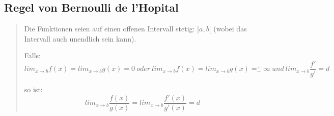 \subsection*{Regel von Bernoulli de l'Hopital}
\begin{quote}
Die Funktionen seien auf einen offenen Intervall stetig: $]a,b[$
(wobei das Intervall auch unendlich sein kann).

Falls:
\[
lim_{x\rightarrow b}f(x)=lim_{x\rightarrow b}g(x)=0\: oder\: lim_{x\rightarrow b}f(x)=lim_{x\rightarrow b}g(x)=_{-}^{+}\infty\: und\: lim_{x\rightarrow b}\frac{f'}{g'}=d
\]


so ist: 
\[
lim_{x\rightarrow b}\frac{f(x)}{g(x)}=lim_{x\rightarrow b}\frac{f'(x)}{g'(x)}=d
\]
\end{quote}


